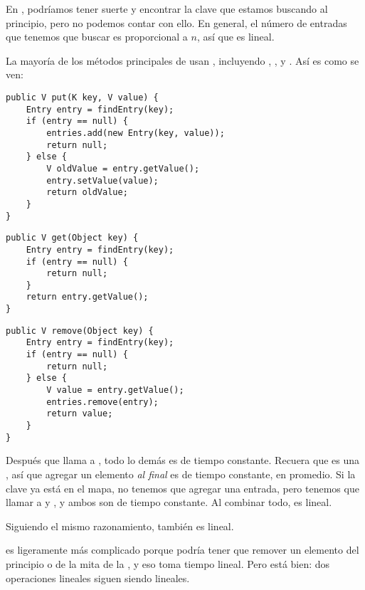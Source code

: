 \documentclass[12pt]{book}
\theoremstyle{exercise}
\begin{document}

En , podríamos tener suerte y encontrar la clave que estamos
buscando al principio, pero no podemos contar con ello. En general, el número
de entradas que tenemos que buscar es proporcional a $n$, así que
 es lineal.


La mayoría de los métodos principales de  usan ,
incluyendo , , y . Así es como se ven:

\begin{verbatim}
public V put(K key, V value) {
    Entry entry = findEntry(key);
    if (entry == null) {
        entries.add(new Entry(key, value));
        return null;
    } else {
        V oldValue = entry.getValue();
        entry.setValue(value);
        return oldValue;
    }
}
\end{verbatim}

\begin{verbatim}
public V get(Object key) {
    Entry entry = findEntry(key);
    if (entry == null) {
        return null;
    }
    return entry.getValue();
}
\end{verbatim}
    
\begin{verbatim}
public V remove(Object key) {
    Entry entry = findEntry(key);
    if (entry == null) {
        return null;
    } else {
        V value = entry.getValue();
        entries.remove(entry);
        return value;
    }
}
\end{verbatim}

Después que  llama a , todo lo demás es de tiempo
constante. Recuera que  es una , así que
agregar un elemento \emph{al final} es de tiempo constante, en promedio. Si la clave ya
está en el mapa, no tenemos que agregar una entrada, pero tenemos que llamar a
 y , y ambos son de
tiempo constante. Al combinar todo,  es lineal.


Siguiendo el mismo razonamiento,  también es lineal.

 es ligeramente más complicado porque
 podría tener que remover un elemento del
principio o de la mita de la , y eso toma tiempo
lineal. Pero está bien: dos operaciones lineales siguen siendo lineales.
\end{document}
